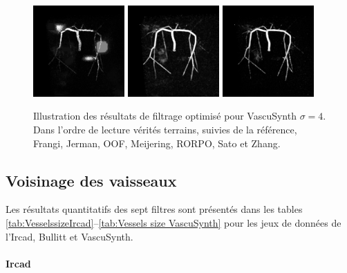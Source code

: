 \begin{figure}[H]
  \\
  \includegraphics[clip = true, trim = 80 80 80 80, height=3.5cm]{Images/Vascu_4_RORPO.png}
  \includegraphics[clip = true, trim = 80 80 80 80, height=3.5cm]{Images/Vascu_4_Sato.png}
  \includegraphics[clip = true, trim = 80 80 80 80, height=3.5cm]{Images/Vascu_4_Zhang.png}

  \caption{Illustration des résultats de filtrage optimisé pour VascuSynth $\sigma=4$.
  Dans l'ordre de lecture vérités terrains, suivies de la référence, Frangi, Jerman, OOF, Meijering, RORPO, Sato et Zhang.}
  \label{fig:qualitative results VascuSynth}
\end{figure}

\subsection{Voisinage des vaisseaux}
Les résultats quantitatifs des sept filtres sont présentés dans les tables \ref{tab:VesselssizeIrcad}--\ref{tab:Vessels size VascuSynth} pour les jeux de données de l'Ircad, Bullitt et VascuSynth.

\paragraph{Ircad}

